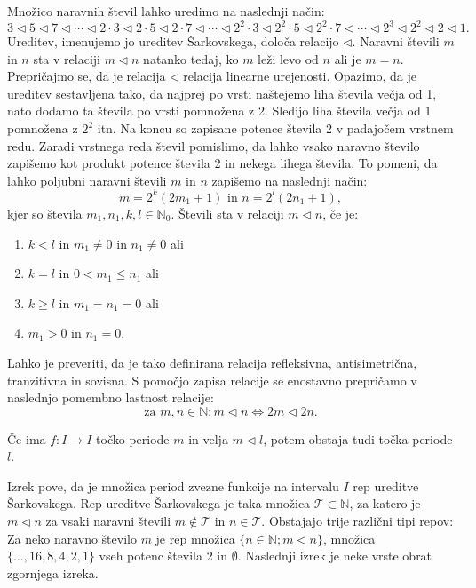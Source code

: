 \documentclass[mat2]{fmfdelo}
\newcommand{\N}{\mathbb N}
\begin{document}
\begin{definicija}
Množico naravnih števil lahko uredimo na naslednji način:
$$3 \triangleleft 5 \triangleleft 7 \triangleleft \cdots \triangleleft 2\cdot 3 \triangleleft 2\cdot 5 \triangleleft 2\cdot 7 \triangleleft \cdots \triangleleft 2^2\cdot 3 \triangleleft 2^2\cdot 5 \triangleleft 2^2\cdot 7 \triangleleft \cdots \triangleleft 2^3 \triangleleft 2^2 \triangleleft 2 \triangleleft 1.$$
Ureditev, imenujemo jo ureditev Šarkovskega, določa relacijo $\triangleleft$. Naravni števili $m$ in $n$ sta v relaciji $m\triangleleft n$ natanko tedaj, ko $m$ leži levo od $n$ ali je $m=n$. Prepričajmo se, da je relacija $\triangleleft$ relacija linearne urejenosti. Opazimo, da je ureditev sestavljena tako, da najprej po vrsti naštejemo liha števila večja od 1, nato dodamo ta števila po vrsti pomnožena z 2. Sledijo liha števila večja od 1 pomnožena z $2^2$ itn. Na koncu so zapisane potence števila 2 v padajočem vrstnem redu. Zaradi vrstnega reda števil pomislimo, da lahko vsako naravno število zapišemo kot produkt potence števila 2 in nekega lihega števila. To pomeni, da lahko poljubni naravni števili $m$ in $n$ zapišemo na naslednji način: 
$$m= 2^k(2m_1 +1)\text{ in } n= 2^l(2n_1 +1),$$
 kjer so števila $m_1, n_1, k, l \in \N_0$. Števili sta v relaciji $m \triangleleft n$, če je:
\begin{enumerate}
\item $k<l$ in $m_1 \neq 0$ in $n_1 \neq 0$ ali
\item $k=l$ in $0<m_1 \leq n_1$ ali
\item $k \geq l$ in $m_1 = n_1=0$ ali
\item $m_1>0$ in $n_1 =0$.
\end{enumerate}
Lahko je preveriti, da je tako definirana relacija refleksivna, antisimetrična, tranzitivna in sovisna.
S pomočjo zapisa relacije se enostavno prepričamo v naslednjo pomembno lastnost relacije:
$$\text{za } m, n \in \N: m \triangleleft n \Leftrightarrow 2m \triangleleft 2n.$$

\end{definicija}



\begin{izrek}\label{izr:forcing}
Če ima $f : I \to I$ točko periode $m$ in velja $ m \triangleleft l$, potem obstaja tudi točka periode $l$.
\end{izrek}
Izrek pove, da je množica period zvezne funkcije na intervalu $I$ rep ureditve Šarkovskega. Rep ureditve Šarkovskega je taka množica $\mathcal{T} \subset \N$, za katero je $m \triangleleft n$ za  vsaki naravni števili $m \notin \mathcal{T}$ in $n \in \mathcal{T}$. Obstajajo trije različni tipi repov:  Za neko naravno število $m$ je rep množica $\{n \in \N; m \triangleleft n\}$, množica $\{\dots, 16, 8, 4, 2, 1\}$ vseh potenc števila 2 in $\emptyset$.
Naslednji izrek je neke vrste obrat zgornjega izreka.
\end{document}
